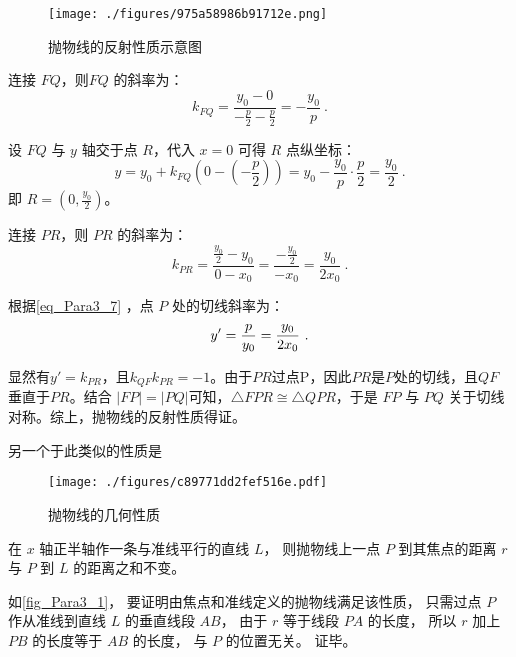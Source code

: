 \begin{figure}[ht]
\centering
\texttt{[image: ./figures/975a58986b91712e.png]}
\caption{抛物线的反射性质示意图} \label{fig_Para3_3}
\end{figure}

连接 $FQ$，则$FQ$ 的斜率为：
\begin{equation}
k_{FQ} = \frac{y_0 - 0}{-\frac{p}{2} - \frac{p}{2}} = -\frac{y_0}{p}~.
\end{equation}

设 $FQ$ 与 $y$ 轴交于点 $R$，代入 $x = 0$ 可得 $R$ 点纵坐标：
\begin{equation}
y = y_0 + k_{FQ}(0 - (-\frac{p}{2})) = y_0 - \frac{y_0}{p} \cdot \frac{p}{2} = \frac{y_0}{2}~.
\end{equation}
即 $\displaystyle R = (0, \frac{y_0}{2})$。

连接 $PR$，则 $PR$ 的斜率为：
\begin{equation}
k_{PR} = \frac{\frac{y_0}{2} - y_0}{0 - x_0} = \frac{-\frac{y_0}{2}}{-x_0} = \frac{y_0}{2x_0}~.
\end{equation}

根据\autoref{eq_Para3_7} ，点 $P$ 处的切线斜率为：
\begin{equation}
y'={p\over y_0}={y_0\over 2x_0}~.
\end{equation}

显然有$y'=k_{PR}$，且$k_{QF}k_{PR}=-1$。由于$PR$过点P，因此$PR$是$P$处的切线，且$QF$垂直于$PR$。结合 $|FP| = |PQ|$可知，$\triangle FPR \cong \triangle QPR$，于是 $FP$ 与 $PQ$ 关于切线对称。综上，抛物线的反射性质得证。

另一个于此类似的性质是
\begin{figure}[ht]
\centering
\texttt{[image: ./figures/c89771dd2fef516e.pdf]}
\caption{抛物线的几何性质} \label{fig_Para3_1}
\end{figure}

在 $x$ 轴正半轴作一条与准线平行的直线 $L$， 则抛物线上一点 $P$ 到其焦点的距离 $r$ 与 $P$ 到 $L$ 的距离之和不变。

如\autoref{fig_Para3_1}， 要证明由焦点和准线定义的抛物线满足该性质， 只需过点 $P$ 作从准线到直线 $L$ 的垂直线段 $AB$， 由于 $r$ 等于线段 $PA$ 的长度， 所以 $r$ 加上 $PB$ 的长度等于 $AB$ 的长度， 与 $P$ 的位置无关。 证毕。